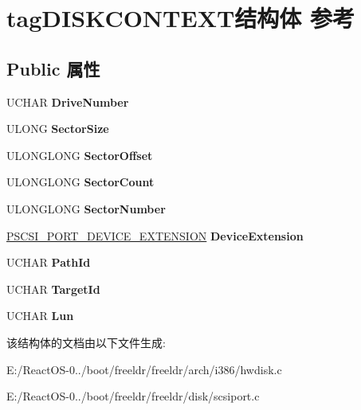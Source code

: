 \hypertarget{structtag_d_i_s_k_c_o_n_t_e_x_t}{}\section{tag\+D\+I\+S\+K\+C\+O\+N\+T\+E\+X\+T结构体 参考}
\label{structtag_d_i_s_k_c_o_n_t_e_x_t}
\subsection*{Public 属性}
\begin{DoxyCompactItemize}
\item 
\mbox{\label{structtag_d_i_s_k_c_o_n_t_e_x_t_ab461d7f7f7232e7bd5186471778b0e76}} 
U\+C\+H\+AR {\bfseries Drive\+Number}
\item 
\mbox{\label{structtag_d_i_s_k_c_o_n_t_e_x_t_aefc108e698fdcb2bf1380e106f08526f}} 
U\+L\+O\+NG {\bfseries Sector\+Size}
\item 
\mbox{\label{structtag_d_i_s_k_c_o_n_t_e_x_t_a1da30ecc9f865507abcf9b7e7b03534d}} 
U\+L\+O\+N\+G\+L\+O\+NG {\bfseries Sector\+Offset}
\item 
\mbox{\label{structtag_d_i_s_k_c_o_n_t_e_x_t_ad35972c2f0f102a8f42babfd0d6417f2}} 
U\+L\+O\+N\+G\+L\+O\+NG {\bfseries Sector\+Count}
\item 
\mbox{\label{structtag_d_i_s_k_c_o_n_t_e_x_t_adb7a2426acd8dc2754a9431d2014e64f}} 
U\+L\+O\+N\+G\+L\+O\+NG {\bfseries Sector\+Number}
\item 
\mbox{\label{structtag_d_i_s_k_c_o_n_t_e_x_t_a63d92a2957de0b14d6344664f3b87831}} 
\hyperlink{struct_s_c_s_i___p_o_r_t___d_e_v_i_c_e___e_x_t_e_n_s_i_o_n}{P\+S\+C\+S\+I\+\_\+\+P\+O\+R\+T\+\_\+\+D\+E\+V\+I\+C\+E\+\_\+\+E\+X\+T\+E\+N\+S\+I\+ON} {\bfseries Device\+Extension}
\item 
\mbox{\label{structtag_d_i_s_k_c_o_n_t_e_x_t_a2a9af62baa5a3fdd26c0dda1a6651afe}} 
U\+C\+H\+AR {\bfseries Path\+Id}
\item 
\mbox{\label{structtag_d_i_s_k_c_o_n_t_e_x_t_a2e646addda64bb5318d47c523d19de86}} 
U\+C\+H\+AR {\bfseries Target\+Id}
\item 
\mbox{\label{structtag_d_i_s_k_c_o_n_t_e_x_t_a3951bb8af7b0316362efdc6b09cb55f1}} 
U\+C\+H\+AR {\bfseries Lun}
\end{DoxyCompactItemize}


该结构体的文档由以下文件生成\+:\begin{DoxyCompactItemize}
\item 
E\+:/\+React\+O\+S-\/0../boot/freeldr/freeldr/arch/i386/hwdisk.\+c\item 
E\+:/\+React\+O\+S-\/0../boot/freeldr/freeldr/disk/scsiport.\+c\end{DoxyCompactItemize}
